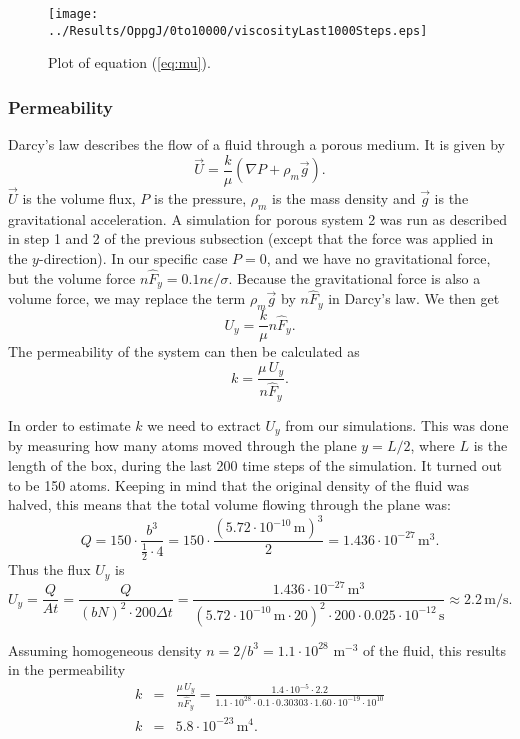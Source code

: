 \documentclass[12pt]{article}
\newcommand{\bdi}{\begin{displaymath}}
\newcommand{\edi}{\end{displaymath}}
\begin{document}
\begin{figure}[!ht]
    \begin{center}
	\texttt{[image: ../Results/OppgJ/0to10000/viscosityLast1000Steps.eps]}
	\caption{Plot of equation (\ref{eq:mu}).}
	\label{fig:mu}
    \end{center}
\end{figure}



\subsubsection{Permeability}
Darcy's law describes the flow of a fluid through a porous medium. It is given by
\bdi
\vec U = \frac{k}{\mu}(\nabla P + \rho_m\vec g).
\edi
$\vec U$ is the volume flux, $P$ is the pressure, $\rho_m$ is the mass density and $\vec g$ is the gravitational acceleration. A simulation for porous system 2 was run as described in step 1 and 2
of the previous subsection (except that the force was applied in the $y$-direction). In our specific case $P=0$, and we have no gravitational force, but the volume force $n\hat F_y = 0.1n\epsilon/\sigma$.
Because the gravitational force is also a volume force, we may replace the term $\rho_m \vec g$ by $n\hat F_y$ in Darcy's law. We then get
\bdi
U_y = \frac{k}{\mu}n\hat F_y.
\edi
The permeability of the system can then be calculated as
\bdi
k = \frac{\mu\,U_y}{n\hat F_y}.
\edi

In order to estimate $k$ we need to extract $U_y$ from our simulations. This was done by measuring how many atoms moved through the plane $y = L/2$, where $L$ is the length of the box, during the last 200
time steps of the simulation. It turned out to be 150 atoms. Keeping in mind that the original density of the fluid was halved, this means that the total volume flowing through the plane was:
\bdi
Q = 150\cdot\frac{b^3}{\frac{1}{2}\cdot4} = 150\cdot\frac{(5.72\cdot 10^{-10}\,\mathrm{m})^3}{2} = 1.436\cdot10^{-27}\,\mathrm{m}^3.
\edi
Thus the flux $U_y$ is
\bdi
U_y = \frac{Q}{At} = \frac{Q}{(bN)^2\cdot200\Delta t} = \frac{1.436\cdot10^{-27}\,\mathrm{m}^3}{(5.72\cdot10^{-10}\,\mathrm{m}\cdot20)^2\cdot200\cdot0.025\cdot10^{-12}\,\mathrm{s}} \approx 2.2\,\mathrm{m/s}.
\edi

Assuming homogeneous density $n = 2/b^3 = 1.1\cdot10^{28}$ m$^{-3}$ of the fluid, this results in the permeability
\begin{eqnarray*}
k & = & \frac{\mu\,U_y}{n\hat F_y} = \frac{1.4\cdot10^{-5}\cdot2.2}{1.1\cdot10^{28}\cdot0.1\cdot0.30303\cdot1.60\cdot10^{-19}\cdot10^{10}} \\
k & = & 5.8\cdot10^{-23}\,\mathrm{m}^4.
\end{eqnarray*}
\end{document}

